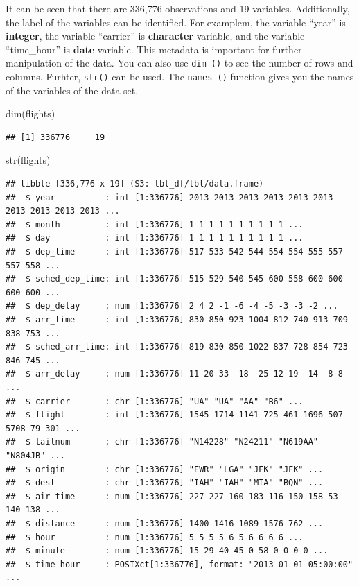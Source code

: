 \documentclass[
]{book}
\newenvironment{Shaded}{\begin{snugshade}}{\end{snugshade}}
\newcommand{\FunctionTok}[1]{\textcolor[rgb]{0.00,0.00,0.00}{#1}}
\newcommand{\NormalTok}[1]{#1}
\begin{document}
It can be seen that there are 336,776 observations and 19 variables. Additionally, the label of the variables can be identified. For examplem, the variable ``year'' is \textbf{integer}, the variable ``carrier'' is \textbf{character} variable, and the variable ``time\_hour'' is \textbf{date} variable. This metadata is important for further manipulation of the data. You can also use \texttt{dim\ ()} to see the number of rows and columns. Furhter, \texttt{str()} can be used. The \texttt{names\ ()} function gives you the names of the variables of the data set.

\begin{Shaded}
\begin{Highlighting}[]
\FunctionTok{dim}\NormalTok{(flights)}
\end{Highlighting}
\end{Shaded}

\begin{verbatim}
## [1] 336776     19
\end{verbatim}

\begin{Shaded}
\begin{Highlighting}[]
\FunctionTok{str}\NormalTok{(flights)}
\end{Highlighting}
\end{Shaded}

\begin{verbatim}
## tibble [336,776 x 19] (S3: tbl_df/tbl/data.frame)
##  $ year          : int [1:336776] 2013 2013 2013 2013 2013 2013 2013 2013 2013 2013 ...
##  $ month         : int [1:336776] 1 1 1 1 1 1 1 1 1 1 ...
##  $ day           : int [1:336776] 1 1 1 1 1 1 1 1 1 1 ...
##  $ dep_time      : int [1:336776] 517 533 542 544 554 554 555 557 557 558 ...
##  $ sched_dep_time: int [1:336776] 515 529 540 545 600 558 600 600 600 600 ...
##  $ dep_delay     : num [1:336776] 2 4 2 -1 -6 -4 -5 -3 -3 -2 ...
##  $ arr_time      : int [1:336776] 830 850 923 1004 812 740 913 709 838 753 ...
##  $ sched_arr_time: int [1:336776] 819 830 850 1022 837 728 854 723 846 745 ...
##  $ arr_delay     : num [1:336776] 11 20 33 -18 -25 12 19 -14 -8 8 ...
##  $ carrier       : chr [1:336776] "UA" "UA" "AA" "B6" ...
##  $ flight        : int [1:336776] 1545 1714 1141 725 461 1696 507 5708 79 301 ...
##  $ tailnum       : chr [1:336776] "N14228" "N24211" "N619AA" "N804JB" ...
##  $ origin        : chr [1:336776] "EWR" "LGA" "JFK" "JFK" ...
##  $ dest          : chr [1:336776] "IAH" "IAH" "MIA" "BQN" ...
##  $ air_time      : num [1:336776] 227 227 160 183 116 150 158 53 140 138 ...
##  $ distance      : num [1:336776] 1400 1416 1089 1576 762 ...
##  $ hour          : num [1:336776] 5 5 5 5 6 5 6 6 6 6 ...
##  $ minute        : num [1:336776] 15 29 40 45 0 58 0 0 0 0 ...
##  $ time_hour     : POSIXct[1:336776], format: "2013-01-01 05:00:00" ...
\end{verbatim}
\end{document}
